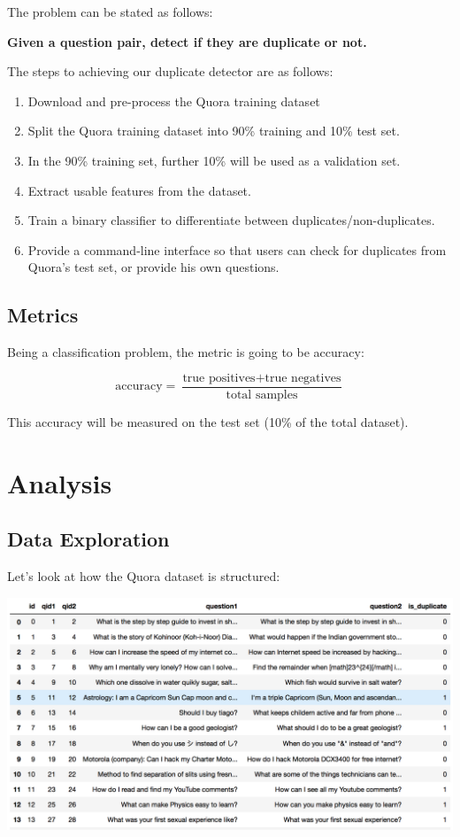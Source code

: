 \documentclass{article}
\begin{document}
The problem can be stated as follows:

\begin{center}
\textbf{Given a question pair, detect if they are duplicate or not.}
\end{center}

The steps to achieving our duplicate detector are as follows:

\begin{enumerate}
\item{Download and pre-process the Quora training dataset}
\item{Split the Quora training dataset into 90\% training and 10\% test set.}
\item{In the 90\% training set, further 10\% will be used as a validation set.}
\item{Extract usable features from the dataset.}
\item{Train a binary classifier to differentiate between duplicates/non-duplicates.}
\item{Provide a command-line interface so that users can check for duplicates from Quora's test set, or provide his own questions.}
\end{enumerate}

\subsection{Metrics}

Being a classification problem, the metric is going to be accuracy:

$$\text{accuracy} = \frac{\text{true positives} + \text{true negatives}}{\text{total samples}}$$

This accuracy will be measured on the test set (10\% of the total dataset).


\section{Analysis}

\subsection{Data Exploration}

Let's look at how the Quora dataset is structured:

\noindent\includegraphics[width=\textwidth]{data_head}
\end{document}
